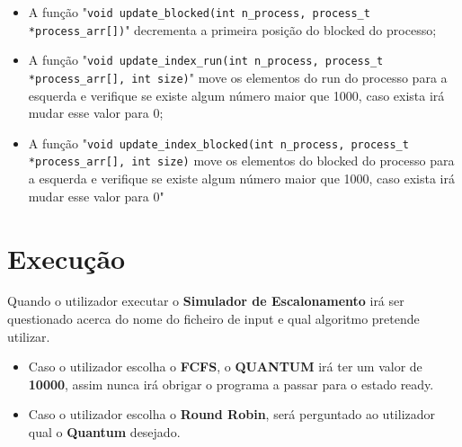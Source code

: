 \documentclass[11pt]{article}   %
\begin{document}
\begin{itemize}
\begin{itemize}
            \item A função "\verb|void update_blocked(int n_process, process_t *process_arr[])|" decrementa a primeira posição do blocked do processo;
            \item A função "\verb|void update_index_run(int n_process, process_t *process_arr[], int size)|" \newline move os elementos do run do processo para a esquerda e verifique se existe algum número maior que 1000, caso exista irá mudar esse valor para 0;
            \item A função "\verb|void update_index_blocked(int n_process, process_t *process_arr[], int size)| \newline move os elementos do blocked do processo para a esquerda e verifique se existe algum número maior que 1000, caso exista irá mudar esse valor para 0"
        \end{itemize}
\end{itemize}

\section{Execução}

\hspace{0,5cm}Quando o utilizador executar o \textbf{Simulador de Escalonamento} irá ser questionado acerca do nome do ficheiro de input e qual algoritmo pretende utilizar.
\begin{itemize}
    \item Caso o utilizador escolha o \textbf{FCFS}, o \textbf{QUANTUM} irá ter um valor de \textbf{10000}, assim nunca irá obrigar o programa a passar para o estado ready.
    \item Caso o utilizador escolha o \textbf{Round Robin}, será perguntado ao utilizador qual o \textbf{Quantum} desejado.
\end{itemize}
\end{document}
